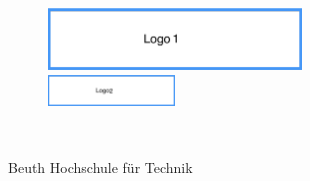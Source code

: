 


%


\thispagestyle{empty}


\begin{figure}[t]
 \centering
 \includegraphics[width=0.6\textwidth]{abb/logo1}
~~~~~~~~~~
 \includegraphics[width=0.3\textwidth]{abb/logo2}
\end{figure}


\begin{verbatim}


\end{verbatim}

\begin{center}
\Large{Beuth Hochschule für Technik}\\
\end{center}


